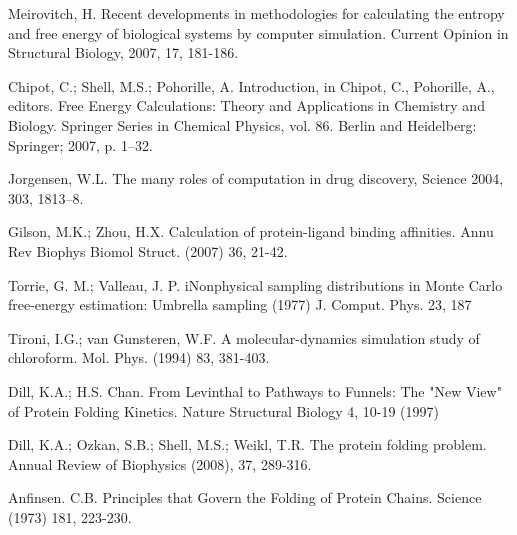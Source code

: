 \documentclass[12pt]{article}
\begin{document}


\begin{thebibliography}{99}

Meirovitch, H. Recent developments in methodologies for calculating the entropy and free energy of biological systems by computer simulation.
Current Opinion in Structural Biology, 2007, 17, 181-186.

Chipot, C.; Shell, M.S.; Pohorille, A. Introduction, in Chipot, C., Pohorille, A., editors. Free Energy
Calculations: Theory and Applications in Chemistry and Biology. Springer Series in Chemical
Physics, vol. 86. Berlin and Heidelberg: Springer; 2007, p. 1–32.

Jorgensen, W.L. The many roles of computation in drug discovery, Science 2004, 303, 1813–8.

Gilson, M.K.; Zhou, H.X. Calculation of protein-ligand binding affinities. Annu Rev Biophys Biomol Struct. (2007) 36, 21-42.

Torrie, G. M.; Valleau, J. P. iNonphysical sampling distributions in Monte Carlo free-energy estimation: Umbrella sampling 
(1977) J. Comput. Phys. 23, 187

Tironi, I.G.; van Gunsteren, W.F. A molecular-dynamics simulation study of chloroform. Mol. Phys. (1994) 83, 381-403.

Dill, K.A.; H.S. Chan.  From Levinthal to Pathways to Funnels:  The "New View" of Protein Folding Kinetics.  Nature Structural Biology 4, 10-19 (1997)

Dill, K.A.; Ozkan, S.B.; Shell, M.S.; Weikl, T.R. The protein folding problem. Annual Review of Biophysics (2008), 37, 289-316.

Anfinsen. C.B. Principles that Govern the Folding of Protein Chains. Science (1973) 181, 223-230.


\end{thebibliography}
\end{document}
